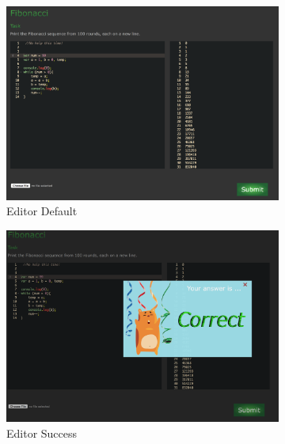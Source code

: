 \documentclass[a4paper]{article}
\begin{document}
\begin{figure}[h!]
  \centering
  \begin{subfigure}[b]{0.3\linewidth}
    \includegraphics[width=\linewidth]{images/editor-default.png}
    \caption{Editor Default}
    \label{fig:editor_default}
  \end{subfigure}
  \begin{subfigure}[b]{0.3\linewidth}
    \includegraphics[width=\linewidth]{images/editor-success.png}
    \caption{Editor Success}
    \label{fig:editor_success}
   \end{subfigure}
   \begin{subfigure}[b]{0.3\linewidth}

\end{subfigure}
\end{figure}
\end{document}
